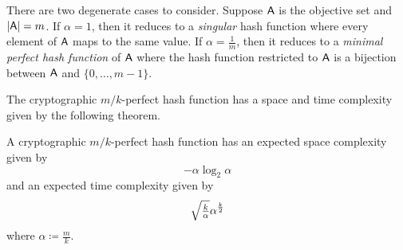 \documentclass[ ../main.tex]{subfiles}
\begin{document}
There are two degenerate cases to consider.
Suppose $\Set{A}$ is the objective set and $\Card{\Set{A}}=m$.
If $\alpha=1$, then it reduces to a \emph{singular} hash function where every element of $\Set{A}$ maps to the same value.
If $\alpha=\frac{1}{m}$, then it reduces to a \emph{minimal perfect hash function} of $\Set{A}$ where the hash function restricted to $\Set{A}$ is a bijection between $\Set{A}$ and $\{0,\ldots,m-1\}$.




The cryptographic $m/k$-perfect hash function has a space and time complexity given by the following theorem.
\begin{theorem}
A cryptographic $m/k$-perfect hash function has an expected space complexity given by
\begin{equation}
	-\alpha \log_2 \alpha
\end{equation}
and an expected time complexity given by
\begin{equation}
	\mathsmaller{\sqrt{\frac{k}{\alpha}}} \alpha^{\frac{k}{2}}
\end{equation}
where $\alpha \coloneqq \frac{m}{k}$.
\end{theorem}
\end{document}
